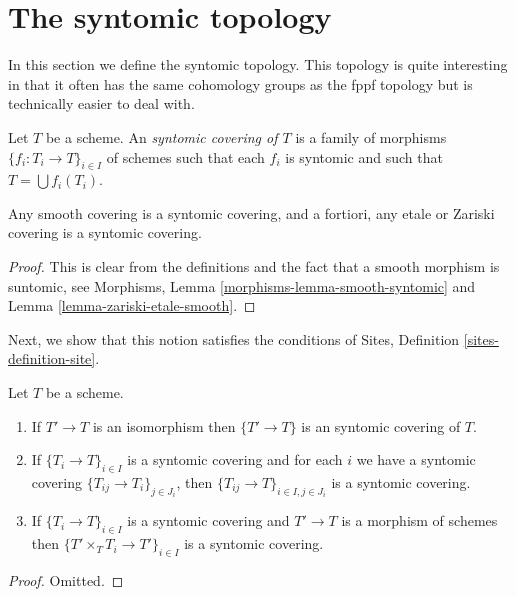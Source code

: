 \section{The syntomic topology}
\label{section-syntomic}

\noindent
In this section we define the syntomic topology.
This topology is quite interesting in that it often
has the same cohomology groups as the fppf topology
but is technically easier to deal with.

\begin{definition}
\label{definition-syntomic-covering}
Let $T$ be a scheme. An {\it syntomic covering of $T$} is a family
of morphisms $\{f_i : T_i \to T\}_{i \in I}$ of schemes
such that each $f_i$ is syntomic and such
that $T = \bigcup f_i(T_i)$.
\end{definition}

\begin{lemma}
\label{lemma-zariski-etale-smooth-syntomic}
Any smooth covering is a syntomic covering, and a fortiori,
any etale or Zariski covering is a syntomic covering.
\end{lemma}

\begin{proof}
This is clear from the definitions and the fact that a smooth
morphism is suntomic, see
Morphisms, Lemma \ref{morphisms-lemma-smooth-syntomic}
and Lemma \ref{lemma-zariski-etale-smooth}.
\end{proof}

\noindent
Next, we show that this notion satisfies the conditions of
Sites, Definition \ref{sites-definition-site}.

\begin{lemma}
\label{lemma-syntomic}
Let $T$ be a scheme.
\begin{enumerate}
\item If $T' \to T$ is an isomorphism then $\{T' \to T\}$
is an syntomic covering of $T$.
\item If $\{T_i \to T\}_{i\in I}$ is a syntomic covering and for each
$i$ we have a syntomic covering $\{T_{ij} \to T_i\}_{j\in J_i}$, then
$\{T_{ij} \to T\}_{i \in I, j\in J_i}$ is a syntomic covering.
\item If $\{T_i \to T\}_{i\in I}$ is a syntomic covering
and $T' \to T$ is a morphism of schemes then
$\{T' \times_T T_i \to T'\}_{i\in I}$ is a syntomic covering.
\end{enumerate}
\end{lemma}

\begin{proof}
Omitted.
\end{proof}

